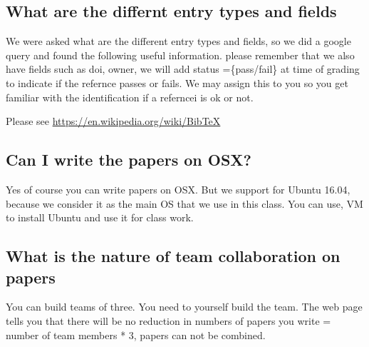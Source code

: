 \begin{sphinxVerbatim}[commandchars=\\\{\}]
              
          
   
    
\end{sphinxVerbatim}


\subsection{What are the differnt entry types and fields}
\label{\detokenize{faq:what-are-the-differnt-entry-types-and-fields}}
We were asked what are the different entry types and fields, so we did
a google query and found the following useful information. please
remember that we also have fields such as doi, owner, we will add
status =\{pass/fail\} at time of grading to indicate if the refernce
passes or fails. We may assign this to you so you get familiar with
the identification if a referncei is ok or not.

Please see \url{https://en.wikipedia.org/wiki/BibTeX}


\subsection{Can I write the papers on OSX?}
\label{\detokenize{faq:can-i-write-the-papers-on-osx}}
Yes of course you can write papers on OSX. But we support for Ubuntu
16.04, because we consider it as the main OS that we use in this
class.  You can use, VM to install Ubuntu and use it for class work.


\subsection{What is the nature of team collaboration on papers}
\label{\detokenize{faq:what-is-the-nature-of-team-collaboration-on-papers}}
You can build teams of three. You need to yourself build the team. The
web page tells you that there will be no reduction in numbers of
papers you write = number of team members * 3, papers can not be
combined.



